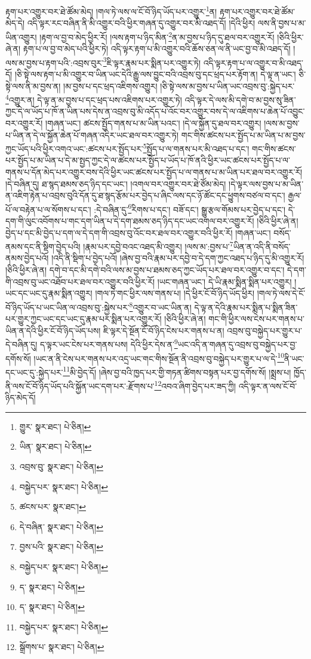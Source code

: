 རྟག་པར་འགྱུར་བར་ཐེ་ཚོམ་མེད། །གལ་ཏེ་ལས་ལ་ངོ་བོ་ཉིད་ཡོད་པར་འགྱུར་\footnote{གྱུར་  སྣར་ཐང་།  པེ་ཅིན། }ན། རྟག་པར་འགྱུར་བར་ཐེ་ཚོམ་མེད་དེ། འདི་ལྟར་རང་བཞིན་ནི་མི་འགྱུར་བའི་ཕྱིར་གཞན་དུ་འགྱུར་བར་མི་འཐད་དོ། །དེའི་ཕྱིར། ལས་ནི་བྱས་པ་མ་ཡིན་འགྱུར། །རྟག་ལ་བྱ་བ་མེད་ཕྱིར་རོ། །ལས་རྟག་པ་ཉིད་མིན་\footnote{ཡིན་  སྣར་ཐང་།  པེ་ཅིན། }ན་མ་བྱས་པ་ཉིད་དུ་ཐལ་བར་འགྱུར་རོ། །ཅིའི་ཕྱིར་ཞེ་ན། རྟག་པ་ལ་བྱ་བ་མེད་པའི་ཕྱིར་ཏེ། འདི་ལྟར་རྟག་པ་མི་འགྱུར་བའི་ཆོས་ཅན་ལ་ནི་ཡང་བྱ་བ་མི་འཐད་དོ། །ལས་མ་བྱས་པ་རྟག་པའི་:འབྲས་བུར་\footnote{འབྲས་བུ་  སྣར་ཐང་།  པེ་ཅིན། }ཇི་ལྟར་རྣམ་པར་སྨིན་པར་འགྱུར་ཏེ། འདི་ལྟར་རྟག་པ་ལ་འགྱུར་བ་མི་འཐད་དོ། །ཅི་སྟེ་ལས་རྟག་པ་མི་འགྱུར་བ་ཡིན་ཡང་དེའི་རྒྱུ་ལས་བྱུང་བའི་འབྲས་བུ་དང་ཕྲད་པར་རྟོག་ན། དེ་ལྟ་ན་ཡང་། ཅི་སྟེ་ལས་ནི་མ་བྱས་ན། །མ་བྱས་པ་དང་ཕྲད་འཇིགས་འགྱུར། །ཅི་སྟེ་ལས་མ་བྱས་པ་ཡིན་ཡང་འབྲས་བུ་:སྐྱེད་པར་\footnote{བསྐྱེད་པར་  སྣར་ཐང་།  པེ་ཅིན། }འགྱུར་ན། དེ་ལྟ་ན་མ་བྱས་པ་དང་ཕྲད་པས་འཇིགས་པར་འགྱུར་ཏེ། འདི་ལྟར་དེ་ལས་མི་དགེ་བ་མ་བྱས་སུ་ཟིན་ཀྱང་དེ་ལ་ཡོད་པ་ཁོ་ན་ཡིན་པས་དེས་ན་འབྲས་བུ་མི་འདོད་པ་འོང་བར་འགྱུར་བས་དེ་ལ་འཇིགས་པ་ཆེན་པོ་འབྱུང་བར་འགྱུར་རོ། །གཞན་ཡང་། ཚངས་སྤྱོད་གནས་པ་མ་ཡིན་པའང་། །དེ་ལ་སྐྱོན་དུ་ཐལ་བར་འགྱུར། །ལས་མ་བྱས་པ་ཡིན་ན་དེ་ལ་སྐྱོན་ཆེན་པོ་གཞན་འདིར་ཡང་ཐལ་བར་འགྱུར་ཏེ། གང་གིས་ཚངས་པར་སྤྱོད་པ་མ་ཡིན་པ་མ་བྱས་ཀྱང་ཡོད་པའི་ཕྱིར་འགའ་ཡང་:ཚངས་པར་སྤྱོད་པར་\footnote{ཚངས་པར་  སྣར་ཐང་། }སྤྱོད་པ་ལ་གནས་པར་མི་འཐད་པ་དང་། གང་གིས་ཚངས་པར་སྤྱོད་པ་མ་ཡིན་པ་དེ་མ་སྤྱད་ཀྱང་དེ་ལ་ཚངས་པར་སྤྱོད་པ་ཡོད་པ་ཁོ་ནའི་ཕྱིར་ཡང་ཚངས་པར་སྤྱོད་པ་ལ་གནས་པ་དོན་མེད་པར་འགྱུར་བས་དེའི་ཕྱིར་ཡང་ཚངས་པར་སྤྱོད་པ་ལ་གནས་པ་མ་ཡིན་པར་ཐལ་བར་འགྱུར་རོ། །དེ་བཞིན་དུ། ཐ་སྙད་ཐམས་ཅད་ཉིད་དང་ཡང་། །འགལ་བར་འགྱུར་བར་ཐེ་ཙོམ་མེད། །དེ་ལྟར་ལས་བྱས་པ་མ་ཡིན་ན་འཇིག་རྟེན་པ་འབྲས་བུའི་དོན་དུ་ཐ་སྙད་རྩོམ་པར་བྱེད་པ་ཞིང་ལས་དང་ཉོ་ཚོང་དང་ཕྱུགས་བཙལ་བ་དང་། རྒྱལ་པོ་ལ་བརྟེན་པ་ལ་སོགས་པ་དང་། :དེ་བཞིན་དུ་\footnote{དེ་བཞིན་  སྣར་ཐང་།  པེ་ཅིན། }རིགས་པ་དང་། བཟོ་དང་། སྒྱུ་རྩལ་གོམས་པར་བྱེད་པ་དང་། དེ་དག་གི་ལུང་འབོགས་པ་གང་དག་ཡིན་པ་དེ་དག་ཐམས་ཅད་ཉིད་དང་ཡང་འགལ་བར་འགྱུར་རོ། །ཅིའི་ཕྱིར་ཞེ་ན། བྱེད་པ་དང་མི་བྱེད་པ་དག་ལ་དེ་དག་གི་འབྲས་བུ་འོང་བར་ཐལ་བར་འགྱུར་བའི་ཕྱིར་རོ། །གཞན་ཡང་། བསོད་ནམས་དང་ནི་སྡིག་བྱེད་པའི། །རྣམ་པར་དབྱེ་བའང་འཐད་མི་འགྱུར། །ལས་མ་:བྱས་པ་\footnote{བྱས་པའི་  སྣར་ཐང་།  པེ་ཅིན། }ཡིན་ན་འདི་ནི་བསོད་ནམས་བྱེད་པའོ། །འདི་ནི་སྡིག་པ་བྱེད་པའོ། །ཞེས་བྱ་བའི་རྣམ་པར་དབྱེ་བ་དེ་དག་ཀྱང་འཐད་པ་ཉིད་དུ་མི་འགྱུར་རོ། །ཅིའི་ཕྱིར་ཞེ་ན། དགེ་བ་དང་མི་དགེ་བའི་ལས་མ་བྱས་པ་ཐམས་ཅད་ཀྱང་ཡོད་པར་ཐལ་བར་འགྱུར་བ་དང་། དེ་དག་གི་འབྲས་བུ་ཡང་འཐོབ་པར་ཐལ་བར་འགྱུར་བའི་ཕྱིར་རོ། །ཡང་གཞན་ཡང་། དེ་ཡི་རྣམ་སྨིན་སྨིན་པར་འགྱུར། །ཡང་དང་ཡང་དུ་རྣམ་སྨིན་འགྱུར། །གལ་ཏེ་གང་ཕྱིར་ལས་གནས་པ། །དེ་ཕྱིར་ངོ་བོ་ཉིད་ཡོད་ཕྱིར། །གལ་ཏེ་ལས་དེ་ངོ་བོ་ཉིད་ཡོད་པ་ཡང་ཡིན་ལ་འབྲས་བུ་:སྐྱེས་པར་\footnote{བསྐྱེད་པར་  སྣར་ཐང་།  པེ་ཅིན། }འགྱུར་བ་ཡང་ཡིན་ན། དེ་ལྟ་ན་དེའི་རྣམ་པར་སྨིན་པ་སྨིན་ཟིན་པར་གྱུར་ཀྱང་ཡང་དང་ཡང་དུ་རྣམ་པར་སྨིན་པར་འགྱུར་རོ། །ཅིའི་ཕྱིར་ཞེ་ན། གང་གི་ཕྱིར་ལས་ངེས་པར་གནས་པ་ཡིན་ན་དེའི་ཕྱིར་ངོ་བོ་ཉིད་ཡོད་པས། ཇི་ལྟར་དེ་སྔོན་ངོ་བོ་ཉིད་ངེས་པར་གནས་པ་ན། འབྲས་བུ་བསྐྱེད་པར་གྱུར་པ་དེ་བཞིན་དུ། ད་ལྟར་ཡང་ངེས་པར་གནས་པས། དེའི་ཕྱིར་དེས་ན་\footnote{ད་  སྣར་ཐང་།  པེ་ཅིན། }ཡང་འདི་ན་གཞན་དུ་འབྲས་བུ་བསྐྱེད་པར་བྱ་དགོས་སོ། །ཡང་ན་ནི་ངེས་པར་གནས་པར་འདྲ་ཡང་གང་གིས་སྔོན་ནི་འབྲས་བུ་བསྐྱེད་པར་གྱུར་པ་ལ་དེ་\footnote{ད་  སྣར་ཐང་།  པེ་ཅིན། }ནི་ཡང་དང་ཡང་དུ་:སྐྱེད་པར་\footnote{བསྐྱེད་པར་  སྣར་ཐང་།  པེ་ཅིན། }མི་བྱེད་དོ། །ཞེས་བྱ་བའི་ཁྱད་པར་གྱི་གཏན་ཚིགས་བསྟན་པར་བྱ་དགོས་སོ། །སྨྲས་པ། ཁྱོད་ནི་ལས་ངོ་བོ་ཉིད་ཡོད་པའི་སྐྱོན་ཡང་དག་པར་:རྫོགས་པ་\footnote{སྒྲོགས་པ་  སྣར་ཐང་།  པེ་ཅིན། }འབའ་ཞིག་བྱེད་པར་ཟད་ཀྱི། འདི་ལྟར་ན་ལས་ངོ་བོ་ཉིད་མེད་དོ། 